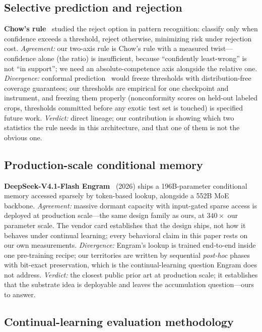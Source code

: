 \documentclass[11pt]{article}
\theoremstyle{definition}\newtheorem{definition}{Definition}
\theoremstyle{remark}\newtheorem{remark}{Remark}
\begin{document}
\subsection{Selective prediction and rejection}
\label{sec:prior:reject}

\textbf{Chow's rule}~\cite{chow} studied the reject option in pattern recognition:
classify only when confidence exceeds a threshold, reject otherwise, minimizing risk
under rejection cost. \emph{Agreement:} our two-axis rule is Chow's rule with a measured
twist---confidence alone (the ratio) is insufficient, because ``confidently least-wrong''
is not ``in support''; we need an absolute-competence axis alongside the relative one.
\emph{Divergence:} conformal prediction~\cite{conformal} would freeze thresholds with
distribution-free coverage guarantees; our thresholds are empirical for one checkpoint and
instrument, and freezing them properly (nonconformity scores on held-out labeled crops,
thresholds committed before any exotic test set is touched) is specified future work.
\emph{Verdict:} direct lineage; our contribution is showing which two statistics the rule
needs in this architecture, and that one of them is not the obvious one.

\subsection{Production-scale conditional memory}
\label{sec:prior:engram}

\textbf{DeepSeek-V4.1-Flash Engram}~\cite{engram} (2026) ships a 196B-parameter
conditional memory accessed sparsely by token-based lookup, alongside a 552B MoE
backbone. \emph{Agreement:} massive dormant capacity with input-gated sparse access is
deployed at production scale---the same design family as ours, at $340\times$ our
parameter scale. The vendor card establishes that the design ships, not how it behaves
under continual learning; every behavioral claim in this paper rests on our own
measurements. \emph{Divergence:} Engram's
lookup is trained end-to-end inside one pre-training recipe; our territories are written
by sequential \emph{post-hoc} phases with bit-exact preservation, which is the
continual-learning question Engram does not address. \emph{Verdict:} the closest public
prior art at production scale; it establishes that the substrate idea is deployable and
leaves the accumulation question---ours to answer.

\subsection{Continual-learning evaluation methodology}
\label{sec:prior:method}
\end{document}
